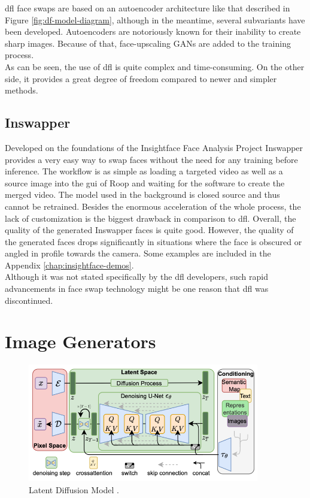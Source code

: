 \documentclass[
  a4paper,  %
  twoside,  %
  bibliography=totoc,
  headsepline,
  cleardoublepage=empty,
  parskip=half,
  draft=false
]{scrbook}
\begin{document}
\gls{dfl} face swaps are based on an autoencoder architecture like that described in Figure \ref{fig:df-model-diagram}, although in the meantime, several subvariants have been developed. Autoencoders are notoriously known for their inability to create sharp images. Because of that, face-upscaling GANs are added to the training process. \\
As can be seen, the use of \gls{dfl} is quite complex and time-consuming. On the other side, it provides a great degree of freedom compared to newer and simpler methods.

\subsection{Inswapper}
\label{sec:roop}
Developed on the foundations of the Insightface Face Analysis Project \cite{insightfaceInsightFaceWebsite} Inswapper provides a very easy way to swap faces without the need for any training before inference. The workflow is as simple as loading a targeted video as well as a source image into the \gls{gui} of Roop \cite{sangwanRoop2023} and waiting for the software to create the merged video. The model used in the background is closed source and thus cannot be retrained. Besides the enormous acceleration of the whole process, the lack of customization is the biggest drawback in comparison to \gls{dfl}. Overall, the quality of the generated Inswapper faces is quite good. However, the quality of the generated faces drops significantly in situations where the face is obscured or angled in profile towards the camera. Some examples are included in the Appendix \ref{chap:insightface-demos}. \\
Although it was not stated specifically by the \gls{dfl} developers, such rapid advancements in face swap technology might be one reason that \gls{dfl} was discontinued.

\section{Image Generators}
\label{sec:stable-diffusion-bg}
\begin{figure}[h]
  \centering
  \includegraphics[width=0.9\textwidth]{./graphics/latent-diffusion.png}
  \caption{Latent Diffusion Model \cite{rombachHighResolutionImageSynthesis2022}.}
  \label{fig:ldm-arch}
\end{figure}
\end{document}
